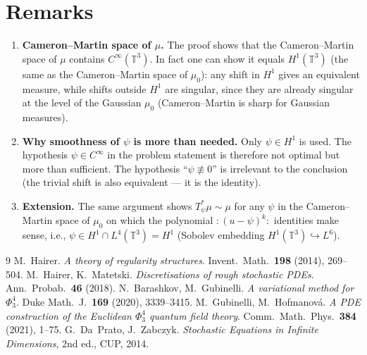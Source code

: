 \section*{Remarks}

\begin{enumerate}\setlength\itemsep{4pt}
\item \textbf{Cameron--Martin space of $\mu$.}  The proof shows that the Cameron--Martin space of $\mu$ contains $C^\infty(\mathbb T^3)$.  In fact one can show it equals $H^1(\mathbb T^3)$ (the same as the Cameron--Martin space of $\mu_0$): any shift in $H^1$ gives an equivalent measure, while shifts outside $H^1$ are singular, since they are already singular at the level of the Gaussian $\mu_0$ (Cameron--Martin is sharp for Gaussian measures).
\item \textbf{Why smoothness of $\psi$ is more than needed.}  Only $\psi\in H^1$ is used.  The hypothesis $\psi\in C^\infty$ in the problem statement is therefore not optimal but more than sufficient.  The hypothesis ``$\psi\not\equiv 0$'' is irrelevant to the conclusion (the trivial shift is also equivalent — it is the identity).
\item \textbf{Extension.}  The same argument shows $T_\psi^*\mu\sim\mu$ for any $\psi$ in the Cameron--Martin space of $\mu_0$ on which the polynomial $:\!(u-\psi)^k\!:$ identities make sense, i.e., $\psi\in H^1\cap L^4(\mathbb T^3)=H^1$ (Sobolev embedding $H^1(\mathbb T^3)\hookrightarrow L^6$).
\end{enumerate}

\begin{thebibliography}{9}
 M.~Hairer.  \emph{A theory of regularity structures}.  Invent.\ Math.\ \textbf{198} (2014), 269--504.
 M.~Hairer, K.~Matetski.  \emph{Discretisations of rough stochastic PDEs}.  Ann.\ Probab.\ \textbf{46} (2018).
 N.~Barashkov, M.~Gubinelli.  \emph{A variational method for $\Phi^4_3$}.  Duke Math.\ J.\ \textbf{169} (2020), 3339--3415.
 M.~Gubinelli, M.~Hofmanová.  \emph{A PDE construction of the Euclidean $\Phi^4_3$ quantum field theory}.  Comm.\ Math.\ Phys.\ \textbf{384} (2021), 1--75.
 G.~Da~Prato, J.~Zabczyk.  \emph{Stochastic Equations in Infinite Dimensions}, 2nd ed., CUP, 2014.
\end{thebibliography}


